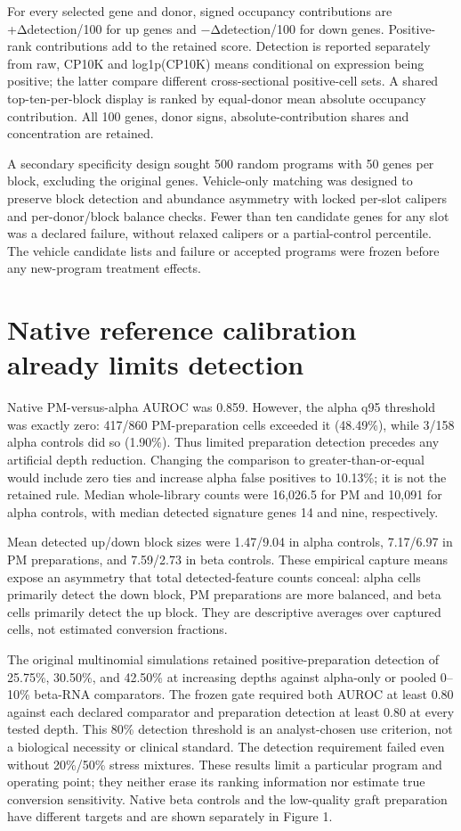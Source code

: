 \documentclass[11pt,letterpaper]{article}
\begin{document}
For every selected gene and donor, signed occupancy contributions are +Δdetection/100 for up genes and −Δdetection/100 for down genes. Positive-rank contributions add to the retained score. Detection is reported separately from raw, CP10K and log1p(CP10K) means conditional on expression being positive; the latter compare different cross-sectional positive-cell sets. A shared top-ten-per-block display is ranked by equal-donor mean absolute occupancy contribution. All 100 genes, donor signs, absolute-contribution shares and concentration are retained.

A secondary specificity design sought 500 random programs with 50 genes per block, excluding the original genes. Vehicle-only matching was designed to preserve block detection and abundance asymmetry with locked per-slot calipers and per-donor/block balance checks. Fewer than ten candidate genes for any slot was a declared failure, without relaxed calipers or a partial-control percentile. The vehicle candidate lists and failure or accepted programs were frozen before any new-program treatment effects.

\section*{Native reference calibration already limits detection}
Native PM-versus-alpha AUROC was 0.859. However, the alpha q95 threshold was exactly zero: 417/860 PM-preparation cells exceeded it (48.49\%), while 3/158 alpha controls did so (1.90\%). Thus limited preparation detection precedes any artificial depth reduction. Changing the comparison to greater-than-or-equal would include zero ties and increase alpha false positives to 10.13\%; it is not the retained rule. Median whole-library counts were 16,026.5 for PM and 10,091 for alpha controls, with median detected signature genes 14 and nine, respectively.

Mean detected up/down block sizes were 1.47/9.04 in alpha controls, 7.17/6.97 in PM preparations, and 7.59/2.73 in beta controls. These empirical capture means expose an asymmetry that total detected-feature counts conceal: alpha cells primarily detect the down block, PM preparations are more balanced, and beta cells primarily detect the up block. They are descriptive averages over captured cells, not estimated conversion fractions.

The original multinomial simulations retained positive-preparation detection of 25.75\%, 30.50\%, and 42.50\% at increasing depths against alpha-only or pooled 0–10\% beta-RNA comparators. The frozen gate required both AUROC at least 0.80 against each declared comparator and preparation detection at least 0.80 at every tested depth. This 80\% detection threshold is an analyst-chosen use criterion, not a biological necessity or clinical standard. The detection requirement failed even without 20\%/50\% stress mixtures. These results limit a particular program and operating point; they neither erase its ranking information nor estimate true conversion sensitivity. Native beta controls and the low-quality graft preparation have different targets and are shown separately in Figure 1.
\end{document}
